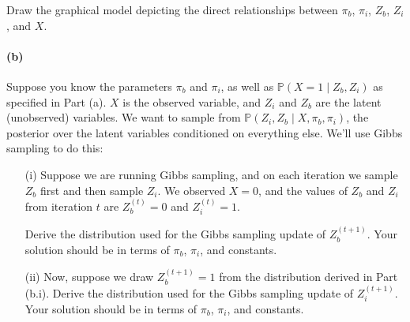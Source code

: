 \documentclass[a4paper,twoside,11pt]{article}
\begin{document}
\noindent Draw the graphical model depicting the direct relationships between $\pi_b$, $\pi_i$, $Z_b$, $Z_i$, and $X$.

\paragraph{(b)} Suppose you know the parameters $\pi_b$ and $\pi_i$, as well as $\mathbb{P}(X = 1 \mid Z_b, Z_i)$ as specified in Part (a). $X$ is the observed variable, and $Z_i$ and $Z_b$ are the latent (unobserved) variables. We want to sample from $\mathbb{P}(Z_i, Z_b \mid X, \pi_b, \pi_i)$, the posterior over the latent variables conditioned on everything else. We'll use Gibbs sampling to do this: 
\begin{enumerate}       
	\item[(i)] Suppose we are running Gibbs sampling, and on each iteration we sample $Z_b$ first and then sample $Z_i$. We observed $X = 0$, and the values of $Z_b$ and $Z_i$ from iteration $t$ are $Z_b^{(t)} = 0$ and $Z_i^{(t)} = 1$.
        
        Derive the distribution used for the Gibbs sampling update of $Z_b^{(t + 1)}$. Your solution should be in terms of $\pi_b$, $\pi_i$, and constants.

	\item[(ii)] Now, suppose we draw $Z_b^{(t + 1)} = 1$ from the distribution derived in Part (b.i). Derive the distribution used for the Gibbs sampling update of $Z_i^{(t + 1)}$. Your solution should be in terms of $\pi_b$, $\pi_i$, and constants.
\end{enumerate}
\end{document}
